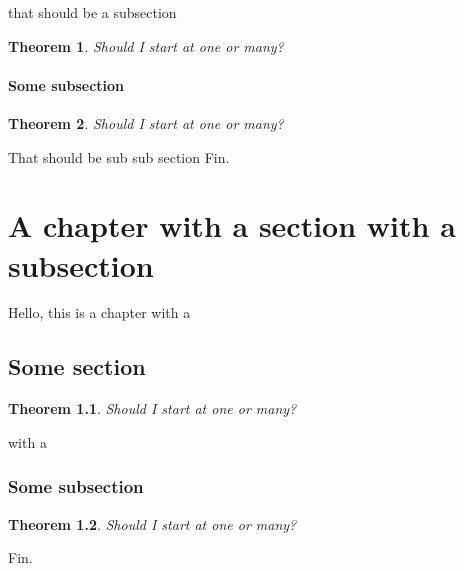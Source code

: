 \documentclass{report}
\newtheorem{theorem}{Theorem}
\begin{document}
that should be a subsection


\begin{theorem}
  Should I start at one or many?
\end{theorem}

\subsubsection{Some subsection}

\begin{theorem}
  Should I start at one or many?
\end{theorem}


That should be sub sub section
Fin.



\chapter{A chapter with a section with a subsection}


Hello, this is a chapter with a

\section{Some section}


\begin{theorem}
  Should I start at one or many?
\end{theorem}
with a

\subsection{Some subsection}

\begin{theorem}
  Should I start at one or many?
\end{theorem}



Fin.
\end{document}
